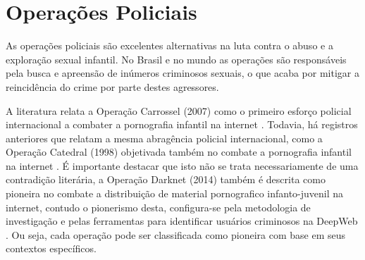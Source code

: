 


\section{Operações Policiais}\label{sec:op}

As operações policiais são excelentes alternativas na luta contra o abuso e a exploração sexual infantil. No Brasil e no mundo as operações são responsáveis pela busca e apreensão de inúmeros criminosos sexuais, o que acaba por mitigar a reincidência do crime por parte destes agressores. 

A literatura relata a Operação Carrossel (2007) como o primeiro esforço policial internacional a combater a pornografia infantil na internet \cite{lowenkron2014all}. Todavia, há registros anteriores que relatam a mesma abragência policial internacional, como a Operação Catedral (1998) objetivada também no combate a pornografia infantil na internet \cite{Barrot2008, jesus2006anti}. É importante destacar que isto não se trata necessariamente de uma contradição literária, a Operação Darknet (2014) também é descrita como pioneira no combate a distribuição de material pornografico infanto-juvenil na internet, contudo o pionerismo desta, configura-se pela metodologia de investigação e pelas ferramentas para identificar usuários criminosos na DeepWeb \cite{tonello2018pedofilia}. Ou seja, cada operação pode ser classificada como pioneira com base em seus contextos específicos. 



